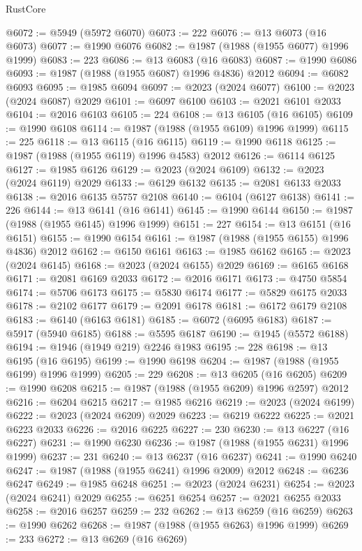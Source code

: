 \begin{lexlean}{RustCore}
\begin{coremodule}
@6072 := @5949 (@5972 @6070)
@6073 := 222
@6076 := @13 @6073 (@16 @6073)
@6077 := @1990 @6076
@6082 := @1987 (@1988 (@1955 @6077) @1996 @1999)
@6083 := 223
@6086 := @13 @6083 (@16 @6083)
@6087 := @1990 @6086
@6093 := @1987 (@1988 (@1955 @6087) @1996 @4836) @2012
@6094 := @6082 @6093
@6095 := @1985 @6094
@6097 := @2023 (@2024 @6077)
@6100 := @2023 (@2024 @6087) @2029
@6101 := @6097 @6100
@6103 := @2021 @6101 @2033
@6104 := @2016 @6103
@6105 := 224
@6108 := @13 @6105 (@16 @6105)
@6109 := @1990 @6108
@6114 := @1987 (@1988 (@1955 @6109) @1996 @1999)
@6115 := 225
@6118 := @13 @6115 (@16 @6115)
@6119 := @1990 @6118
@6125 := @1987 (@1988 (@1955 @6119) @1996 @4583) @2012
@6126 := @6114 @6125
@6127 := @1985 @6126
@6129 := @2023 (@2024 @6109)
@6132 := @2023 (@2024 @6119) @2029
@6133 := @6129 @6132
@6135 := @2081 @6133 @2033
@6138 := @2016 @6135 @5757 @2108
@6140 := @6104 (@6127 @6138)
@6141 := 226
@6144 := @13 @6141 (@16 @6141)
@6145 := @1990 @6144
@6150 := @1987 (@1988 (@1955 @6145) @1996 @1999)
@6151 := 227
@6154 := @13 @6151 (@16 @6151)
@6155 := @1990 @6154
@6161 := @1987 (@1988 (@1955 @6155) @1996 @4836) @2012
@6162 := @6150 @6161
@6163 := @1985 @6162
@6165 := @2023 (@2024 @6145)
@6168 := @2023 (@2024 @6155) @2029
@6169 := @6165 @6168
@6171 := @2081 @6169 @2033
@6172 := @2016 @6171
@6173 := @4750 @5854
@6174 := @5706 @6173
@6175 := @5830 @6174
@6177 := @5829 @6175 @2033
@6178 := @2102 @6177
@6179 := @2091 @6178
@6181 := @6172 @6179 @2108
@6183 := @6140 (@6163 @6181)
@6185 := @6072 (@6095 @6183)
@6187 := @5917 (@5940 @6185)
@6188 := @5595 @6187
@6190 := @1945 (@5572 @6188)
@6194 := @1946 (@1949 @219) @2246 @1983
@6195 := 228
@6198 := @13 @6195 (@16 @6195)
@6199 := @1990 @6198
@6204 := @1987 (@1988 (@1955 @6199) @1996 @1999)
@6205 := 229
@6208 := @13 @6205 (@16 @6205)
@6209 := @1990 @6208
@6215 := @1987 (@1988 (@1955 @6209) @1996 @2597) @2012
@6216 := @6204 @6215
@6217 := @1985 @6216
@6219 := @2023 (@2024 @6199)
@6222 := @2023 (@2024 @6209) @2029
@6223 := @6219 @6222
@6225 := @2021 @6223 @2033
@6226 := @2016 @6225
@6227 := 230
@6230 := @13 @6227 (@16 @6227)
@6231 := @1990 @6230
@6236 := @1987 (@1988 (@1955 @6231) @1996 @1999)
@6237 := 231
@6240 := @13 @6237 (@16 @6237)
@6241 := @1990 @6240
@6247 := @1987 (@1988 (@1955 @6241) @1996 @2009) @2012
@6248 := @6236 @6247
@6249 := @1985 @6248
@6251 := @2023 (@2024 @6231)
@6254 := @2023 (@2024 @6241) @2029
@6255 := @6251 @6254
@6257 := @2021 @6255 @2033
@6258 := @2016 @6257
@6259 := 232
@6262 := @13 @6259 (@16 @6259)
@6263 := @1990 @6262
@6268 := @1987 (@1988 (@1955 @6263) @1996 @1999)
@6269 := 233
@6272 := @13 @6269 (@16 @6269)

\end{coremodule}
\end{lexlean}
